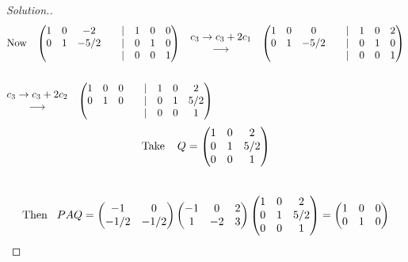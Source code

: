 \documentclass[11pt,a4paper]{article}
\theoremstyle{definition}
\newenvironment{solution}
  {\renewcommand{\qedsymbol}{}\begin{proof}[\textit{Solution}.]}
  {\end{proof}}
\begin{document}
\begin{solution}
\begin{align*}
&\text{Now}\hspace{0.3cm}
\begin{pmatrix}
1&0&-2&&|&1&0&0\\0&1&-5/2&&|&0&1&0\\&&&&|&0&0&1\\
\end{pmatrix}
\hspace{0.3cm}
\begin{matrix}
c_3\rightarrow c_3+2c_1\\ \longrightarrow\\
\end{matrix}
\hspace{0.3cm}
\begin{pmatrix}
1&0&0&&|&1&0&2\\0&1&-5/2&&|&0&1&0\\&&&&|&0&0&1\\
\end{pmatrix}\\\\
&
\begin{matrix}
c_3\rightarrow c_3+2c_2\\ \longrightarrow\\
\end{matrix}
\hspace{0.3cm}
\begin{pmatrix}
1&0&0&&|&1&0&2\\0&1&0&&|&0&1&5/2\\&&&&|&0&0&1\\
\end{pmatrix}\\
\end{align*}
$$\text{Take}\hspace{0.4cm}Q=
\begin{pmatrix}
1&0&2\\0&1&5/2\\0&0&1\\
\end{pmatrix}
$$\\

$$\text{Then}\hspace{0.3cm} PAQ=
\begin{pmatrix}
-1&0\\-1/2&-1/2\\
\end{pmatrix}
\begin{pmatrix}
-1&0&2\\1&-2&3\\
\end{pmatrix}
\begin{pmatrix}
1&0&2\\0&1&5/2\\0&0&1\\
\end{pmatrix}
=
\begin{pmatrix}
1&0&0\\0&1&0\\
\end{pmatrix}
$$


\end{solution}
\end{document}
